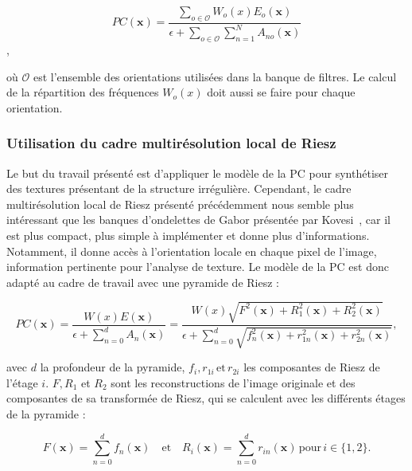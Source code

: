 \begin{equation}
    PC(\mathbf{x}) = \frac{\sum_{o\in \mathcal{O}} W_o(x)E_o(\mathbf{x})}{\epsilon + \sum_{o \in \mathcal{O}}\sum_{n=1}^{N} A_{no}(\mathbf{x})}
\end{equation},

où $\mathcal{O}$ est l'ensemble des orientations utilisées dans la banque de filtres. Le calcul de la répartition des fréquences $W_o(x)$ doit aussi se faire pour chaque orientation.

\subsubsection{Utilisation du cadre multirésolution local de Riesz}

Le but du travail présenté est d'appliquer le modèle de la PC pour synthétiser des textures présentant de la structure irrégulière. Cependant, le cadre multirésolution local de Riesz présenté précédemment nous semble plus intéressant que les banques d'ondelettes de Gabor présentée par Kovesi~\cite{kovesi_image_1995}, car il est plus compact, plus simple à implémenter et donne plus d'informations. Notamment, il donne accès à l'orientation locale en chaque pixel de l'image, information pertinente pour l'analyse de texture. Le modèle de la PC est donc adapté au cadre de travail avec une pyramide de Riesz :

\begin{equation}
    PC(\mathbf{x}) = \frac{W(x)E(\mathbf{x})}{\epsilon + \sum_{n=0}^{d} A_{n}(\mathbf{x})} = \frac{W(x)\sqrt{F^2(\mathbf{x})+R_1^2(\mathbf{x})+R_2^2(\mathbf{x})}}{\epsilon + \sum_{n=0}^{d} \sqrt{f_n^2(\mathbf{x}) + r_{1n}^2(\mathbf{x}) + r_{2n}^2(\mathbf{x})}},
\end{equation}

avec $d$ la profondeur de la pyramide, $f_i, r_{1i}\, \text{et}\, r_{2i}$ les composantes de Riesz de l'étage $i$. $F, R_1$ et $R_2$ sont les reconstructions de l'image originale et des composantes de sa transformée de Riesz, qui se calculent avec les différents étages de la pyramide :

\begin{equation}
    F(\mathbf{x}) = \sum_{n=0}^{d} f_n(\mathbf{x}) \quad \text{et} \quad R_i(\mathbf{x}) = \sum_{n=0}^{d} r_{in}(\mathbf{x})\, \text{pour}\, i \in \{1, 2\}.
\end{equation}

